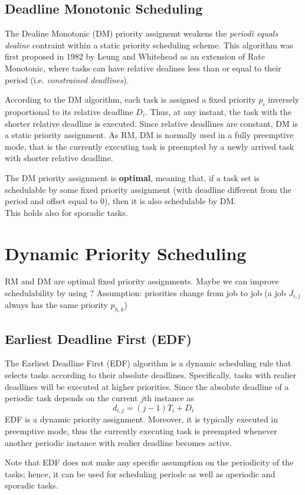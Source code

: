 \subsection{Deadline Monotonic Scheduling}
The Dealine Monotonic (DM) priority assignemt weakens the \textit{periodi equals dealine} contraint within a static priority scheduling scheme. This algorithm was first proposed in 1982 by Leung and Whitehead as an extension of Rate Monotonic, where tasks can have relative dealines less than or equal to their period (i.e. \textit{constrained deadlines}).

According to the DM algorithm, each task is assigned a fixed priority $p_i$ inversely proportional to its relative deadline $D_i$. Thus, at any instant, the task with the shorter relative deadline is executed. Since relative deadlines are constant, DM is a static priority assignment. As RM, DM is normally used in a fully preemptive mode, that is the currently executing task is preempted by a newly arrived task with shorter relative deadline.

The DM priority assignment is \textbf{optimal}, meaning that, if a task set is schedulable by some fixed priority assignment (with deadline different from the period and offset equal to 0), then it is also schedulable by DM.\\
This holds also for sporadic tasks.

\section{Dynamic Priority Scheduling}
RM and DM are optimal fixed priority assignments. Maybe we can improve schedulability by using ?
Assumption: priorities change from job to job (a job $J_{i,j}$ always has the same priority $p_{h,k}$)

\subsection{Earliest Deadline First (EDF)}

The Earliest Deadline First (EDF) algorithm is a dynamic scheduling rule that selects tasks according to their absolute deadlines. Specifically, tasks with realier deadlines will be executed at higher priorities. Since the absolute deadline of a periodic task depends on the current $j$th instance as
\[d_{i,j} = (j-1) T_i + D_i\]
EDF is a dynamic priority assignment. Moreover, it is typically executed in preemptive mode, thus the currently executing task is preempted whenever another periodic instance with realier deadline becomes active.

Note that EDF does not make any specific assumption on the periodicity of the tasks; hence, it can be used for scheduling periodc as well as aperiodic and sporadic tasks.


